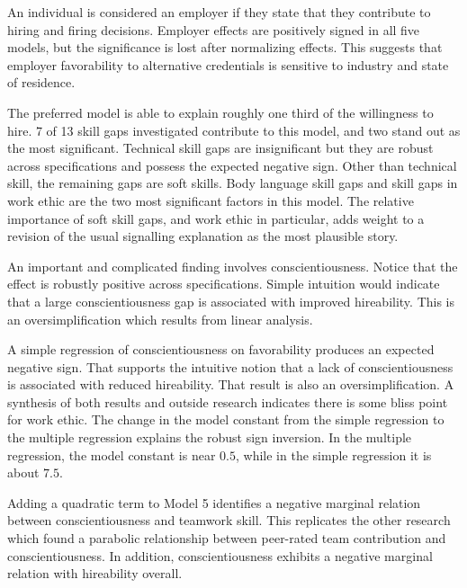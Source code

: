 \documentclass[review]{elsarticle}
\begin{document}
An individual is considered an employer if they state that they contribute to hiring and firing decisions.
Employer effects are positively signed in all five models, but the significance is lost after normalizing effects.
This suggests that employer favorability to alternative credentials is sensitive to industry and state of residence.

The preferred model is able to explain roughly one third of the willingness to hire.
7 of 13 skill gaps investigated contribute to this model, and two stand out as the most significant.
Technical skill gaps are insignificant but they are robust across specifications and possess the expected negative sign.
Other than technical skill, the remaining gaps are soft skills.
Body language skill gaps and skill gaps in work ethic are the two most significant factors in this model.
The relative importance of soft skill gaps, and work ethic in particular, adds weight to a revision of the usual signalling explanation as the most plausible story.

An important and complicated finding involves conscientiousness.
Notice that the effect is robustly positive across specifications.
Simple intuition would indicate that a large conscientiousness gap is associated with improved hireability.
This is an oversimplification which results from linear analysis.

A simple regression of conscientiousness on favorability produces an expected negative sign.
That supports the intuitive notion that a lack of conscientiousness is associated with reduced hireability.
That result is also an oversimplification.
A synthesis of both results and outside research indicates there is some bliss point for work ethic.
The change in the model constant from the simple regression to the multiple regression explains the robust sign inversion.
In the multiple regression, the model constant is near $0.5$, while in the simple regression it is about $7.5$.

Adding a quadratic term to Model 5 identifies a negative marginal relation between conscientiousness and teamwork skill.
This replicates the other research which found a parabolic relationship between peer-rated team contribution and conscientiousness.
In addition, conscientiousness exhibits a negative marginal relation with hireability overall.
\end{document}
